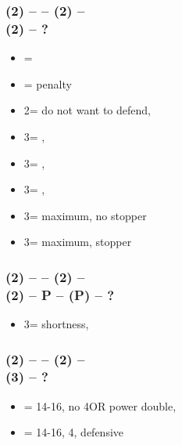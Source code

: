 \documentclass[12pt, a4paper]{article}
\begin{document}
\subsubsection*{(2\diams) -- \dbl -- (2\hearts) -- \dbl \\
                (2\spades) -- ?}        
\begin{itemize}
    \item \pass = \fonce
    \item \dbl = penalty
    \item 2\nt = do not want to defend, \gf
    \item 3\clubs = \nat, \gf
    \item 3\diams = \nat, \gf
    \item 3\hearts = \nat, \gf
    \item 3\spades = maximum, no \spades stopper
    \item 3\nt = maximum, stopper
\end{itemize}

\subsubsection*{(2\diams) -- \dbl -- (2\hearts) -- \dbl \\
                (2\spades) -- P -- (P) -- ?}
\begin{itemize}
    \item 3\spades = \spades shortness, \gf %
\end{itemize}

\subsubsection*{(2\diams) -- \dbl -- (2\spades) -- \dbl \\
                (3\hearts) -- ?}  
\begin{itemize}
    \item \pass = 14-16, no 4\spades OR power double, \fonce
    \item \dbl = 14-16, 4\spades, defensive
    
\end{itemize}


\end{document}
